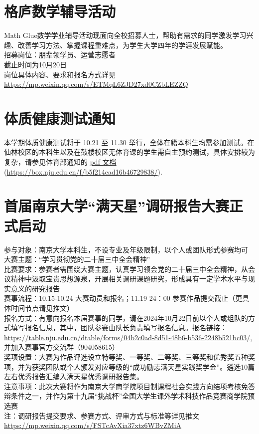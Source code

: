 \documentclass[letterpaper, 12pt]{article}
\begin{document}
\begin{multicols}{2}
\section{格庐数学辅导活动}
Math Glue数学学业辅导活动现面向全校招募人士，帮助有需求的同学激发学习兴趣、改善学习方法、掌握课程重难点，为学生大学四年的学涯发展赋能。\\
招募岗位：朋辈领学员、运营志愿者\\
截止时间为10月20日\\
岗位具体内容、要求和报名方式详见\url{https://mp.weixin.qq.com/s/ETMqL6ZJD27xd0CZbLEZZQ}

\section{体质健康测试通知}
本学期体质健康测试将于 10.21 至 11.30 举行，全体在籍本科生均需参加测试。在仙林校区的本科生以及在鼓楼校区无体育课的学生需自主预约测试，具体安排较为复杂，请参见体育部通知的 \href{https://box.nju.edu.cn/f/b5f214ead16b46729838/}{pdf 文档} (\url{https://box.nju.edu.cn/f/b5f214ead16b46729838/}).

\section{首届南京大学“满天星”调研报告大赛正式启动}
参与对象：南京大学本科生，不设专业及年级限制，以个人或团队形式参赛均可\\
大赛主题：“学习贯彻党的二十届三中全会精神”\\
比赛要求：参赛者需围绕大赛主题，认真学习领会党的二十届三中全会精神，从会议精神中汲取宝贵思想源泉，开展相关调研课题研究，形成具有一定学术水平与现实意义的研究报告\\
赛事流程：10.15-10.24 大赛动员和报名；11.19 24：00 参赛作品提交截止（更具体时间节点请见推文）\\
报名方式：有意向报名本届赛事的同学，请在2024年10月22日前以个人或组队的方式填写报名信息，其中，团队参赛由队长负责填写报名信息。报名链接：\url{https://table.nju.edu.cn/dtable/forms/04b2c0ad-8d51-48b6-b536-2248b521bc03/},并加入赛事官方交流群（904058615）\\
奖项设置：大赛为作品评选设立特等奖、一等奖、二等奖、三等奖和优秀奖五种奖项，并为获奖团队或个人颁发对应等级的“成功励志满天星实践奖学金”。遴选10篇左右优秀报告汇编入满天星优秀调研报告集。\\
注意事项：此次大赛将作为南京大学商学院项目制课程社会实践方向结项考核免答辩条件之一，并作为第十九届“挑战杯”全国大学生课外学术科技作品竞赛商学院预选赛\\
注：调研报告提交要求、参赛方式、评审方式与标准等详见推文\url{https://mp.weixin.qq.com/s/FSTcAvXia37xtz6WBvZMiA}\\


\end{multicols}
\end{document}
